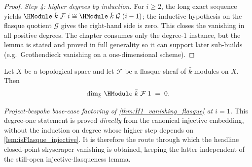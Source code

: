 \begin{proof}
  \emph{Step 4: higher degrees by induction.} For \(i \ge 2\), the long
  exact sequence yields
  \(\HModule\;\bar k\;\mathcal F\;i \cong \HModule\;\bar k\;\mathcal G\;
  (i - 1)\); the inductive hypothesis on the flasque quotient
  \(\mathcal G\) gives the right-hand side is zero. This closes the
  vanishing in all positive degrees. The chapter consumes only the
  degree-\(1\) instance, but the lemma is stated and proved in full
  generality so it can support later sub-builds (e.g.\ Grothendieck
  vanishing on a one-dimensional scheme).

\end{proof}

\begin{lemma}
  \label{lem:H1_flasque_eq_zero}
  Let \(X\) be a topological space and let \(\mathcal F\) be a flasque
  sheaf of \(\bar k\)-modules on \(X\). Then
  \[
    \dim_{\bar k}\, \HModule\;\bar k\;\mathcal F\;1 \;=\; 0.
  \]

  \textit{Project-bespoke base-case factoring of
  \cref{thm:H1_vanishing_flasque} at \(i = 1\).} This degree-one
  statement is proved \emph{directly} from the canonical injective
  embedding, without the induction on degree whose higher step depends on
  \cref{lem:isFlasque_injective}. It is therefore the route through which
  the headline closed-point skyscraper vanishing is obtained, keeping the
  latter independent of the still-open injective-flasqueness lemma.
\end{lemma}

